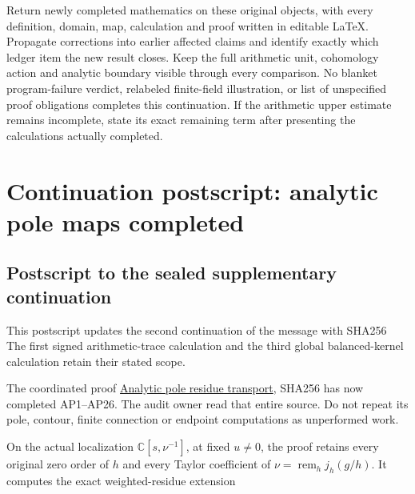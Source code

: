 Return newly completed mathematics on these original objects, with every
definition, domain, map, calculation and proof written in editable
LaTeX. Propagate corrections into earlier affected claims and identify
exactly which ledger item the new result closes. Keep the full
arithmetic unit, cohomology action and analytic boundary visible through
every comparison. No blanket program-failure verdict, relabeled
finite-field illustration, or list of unspecified proof obligations
completes this continuation. If the arithmetic upper estimate remains
incomplete, state its exact remaining term after presenting the
calculations actually completed.

\clearpage

\section{Continuation postscript: analytic pole maps
completed}\label{continuation-postscript-analytic-pole-maps-completed}

\subsection{Postscript to the sealed supplementary
continuation}\label{postscript-to-the-sealed-supplementary-continuation}

This postscript updates the second continuation of the message with
SHA256
\protect{}
The first signed arithmetic-trace calculation and the third global
balanced-kernel calculation retain their stated scope.

The coordinated proof
\href{dependencies/remote/f1_unit_gauge/ANALYTIC_POLE_RESIDUE_TRANSPORT.md}{Analytic
pole residue transport}, SHA256
\protect{}
has now completed AP1--AP26. The audit owner read that entire source. Do
not repeat its pole, contour, finite connection or endpoint computations
as unperformed work.

On the actual localization \(\mathbb C[s,\nu^{-1}]\), at fixed
\(u\ne0\), the proof retains every original zero order of \(h\) and
every Taylor coefficient of \(\nu=\operatorname{rem}_h j_h(g/h)\). It
computes the exact weighted-residue extension


